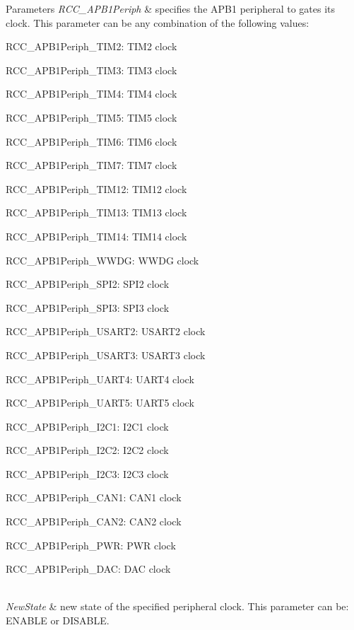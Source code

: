 \begin{DoxyParams}{Parameters}
{\em R\+C\+C\+\_\+\+A\+P\+B1\+Periph} & specifies the A\+P\+B1 peripheral to gates its clock. This parameter can be any combination of the following values\+: \begin{DoxyItemize}
\item R\+C\+C\+\_\+\+A\+P\+B1\+Periph\+\_\+\+T\+I\+M2\+: T\+I\+M2 clock \item R\+C\+C\+\_\+\+A\+P\+B1\+Periph\+\_\+\+T\+I\+M3\+: T\+I\+M3 clock \item R\+C\+C\+\_\+\+A\+P\+B1\+Periph\+\_\+\+T\+I\+M4\+: T\+I\+M4 clock \item R\+C\+C\+\_\+\+A\+P\+B1\+Periph\+\_\+\+T\+I\+M5\+: T\+I\+M5 clock \item R\+C\+C\+\_\+\+A\+P\+B1\+Periph\+\_\+\+T\+I\+M6\+: T\+I\+M6 clock \item R\+C\+C\+\_\+\+A\+P\+B1\+Periph\+\_\+\+T\+I\+M7\+: T\+I\+M7 clock \item R\+C\+C\+\_\+\+A\+P\+B1\+Periph\+\_\+\+T\+I\+M12\+: T\+I\+M12 clock \item R\+C\+C\+\_\+\+A\+P\+B1\+Periph\+\_\+\+T\+I\+M13\+: T\+I\+M13 clock \item R\+C\+C\+\_\+\+A\+P\+B1\+Periph\+\_\+\+T\+I\+M14\+: T\+I\+M14 clock \item R\+C\+C\+\_\+\+A\+P\+B1\+Periph\+\_\+\+W\+W\+DG\+: W\+W\+DG clock \item R\+C\+C\+\_\+\+A\+P\+B1\+Periph\+\_\+\+S\+P\+I2\+: S\+P\+I2 clock \item R\+C\+C\+\_\+\+A\+P\+B1\+Periph\+\_\+\+S\+P\+I3\+: S\+P\+I3 clock \item R\+C\+C\+\_\+\+A\+P\+B1\+Periph\+\_\+\+U\+S\+A\+R\+T2\+: U\+S\+A\+R\+T2 clock \item R\+C\+C\+\_\+\+A\+P\+B1\+Periph\+\_\+\+U\+S\+A\+R\+T3\+: U\+S\+A\+R\+T3 clock \item R\+C\+C\+\_\+\+A\+P\+B1\+Periph\+\_\+\+U\+A\+R\+T4\+: U\+A\+R\+T4 clock \item R\+C\+C\+\_\+\+A\+P\+B1\+Periph\+\_\+\+U\+A\+R\+T5\+: U\+A\+R\+T5 clock \item R\+C\+C\+\_\+\+A\+P\+B1\+Periph\+\_\+\+I2\+C1\+: I2\+C1 clock \item R\+C\+C\+\_\+\+A\+P\+B1\+Periph\+\_\+\+I2\+C2\+: I2\+C2 clock \item R\+C\+C\+\_\+\+A\+P\+B1\+Periph\+\_\+\+I2\+C3\+: I2\+C3 clock \item R\+C\+C\+\_\+\+A\+P\+B1\+Periph\+\_\+\+C\+A\+N1\+: C\+A\+N1 clock \item R\+C\+C\+\_\+\+A\+P\+B1\+Periph\+\_\+\+C\+A\+N2\+: C\+A\+N2 clock \item R\+C\+C\+\_\+\+A\+P\+B1\+Periph\+\_\+\+P\+WR\+: P\+WR clock \item R\+C\+C\+\_\+\+A\+P\+B1\+Periph\+\_\+\+D\+AC\+: D\+AC clock \end{DoxyItemize}
\\
\hline
{\em New\+State} & new state of the specified peripheral clock. This parameter can be\+: E\+N\+A\+B\+LE or D\+I\+S\+A\+B\+LE. \\
\hline
\end{DoxyParams}

